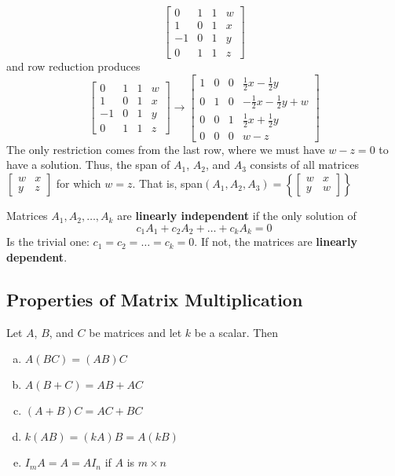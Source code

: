 \[\left[\begin{array}{ccc|c}
            0  & 1 & 1 & w \\
            1  & 0 & 1 & x \\
            -1 & 0 & 1 & y \\
            0  & 1 & 1 & z
        \end{array}\right]\]
and row reduction produces
\[
    \left[\begin{array}{ccc|c}
            0  & 1 & 1 & w \\
            1  & 0 & 1 & x \\
            -1 & 0 & 1 & y \\
            0  & 1 & 1 & z
        \end{array}\right]\to
    \left[\begin{array}{ccc|c}
            1 & 0 & 0 & \frac{1}{2}x-\frac{1}{2}y    \\
            0 & 1 & 0 & -\frac{1}{2}x-\frac{1}{2}y+w \\
            0 & 0 & 1 & \frac{1}{2}x+\frac{1}{2}y    \\
            0 & 0 & 0 & w-z
        \end{array}\right]
\]
The only restriction comes from the last row, where we must have $w-z=0$ to have a
solution. Thus, the span of $A_1$, $A_2$, and $A_3$ consists of all matrices
$\begin{bmatrix}
        w & x \\
        y & z
    \end{bmatrix}$ for which $w=z$. That is, span$(A_1,A_2,A_3)=\left\{\begin{bmatrix}
        w & x \\
        y & w
    \end{bmatrix}\right\}$

Matrices $A_1, A_2, \dots, A_k$ are \textbf{linearly independent} if the only solution of
\[c_1A_1+c_2A_2+\dots+c_kA_k=0\]
Is the trivial one: $c_1=c_2=\dots=c_k=0$. If not, the matrices are \textbf{linearly dependent}.

\subsection*{Properties of Matrix Multiplication}
Let $A$, $B$, and $C$ be matrices and let $k$ be a scalar. Then
\begin{enumerate}[(a)]
    \item $A(BC)=(AB)C$
    \item $A(B+C)=AB+AC$
    \item $(A+B)C=AC+BC$
    \item $k(AB)=(kA)B=A(kB)$
    \item $I_mA=A=AI_n$ if $A$ is $m\times n$
\end{enumerate}

